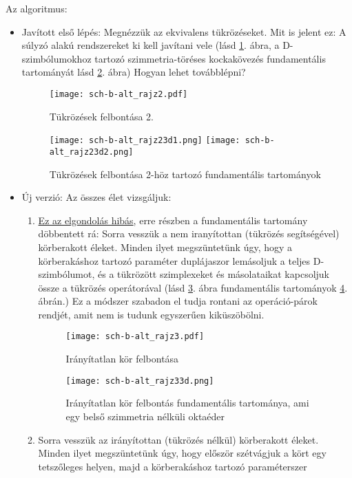 \documentclass[12pt,magyar,a4paper]{article}
\begin{document}
Az algoritmus:
\begin{itemize}
  \item Javított első lépés: Megnézzük az ekvivalens tükrözéseket. Mit is jelent
    ez: A súlyzó alakú rendszereket ki kell javítani vele (lásd \ref{schrajz2}.
    ábra, a D-szimbólumokhoz tartozó szimmetria-töréses kockakövezés
    fundamentális tartományát lásd \ref{schrajz23d}. ábra) Hogyan lehet továbblépni?
    \begin{figure}
      \caption{\label{schrajz2} Tükrözések felbontása 2.}
      \center
      \texttt{[image: sch-b-alt\_rajz2.pdf]}
    \end{figure}
    \begin{figure}
      \caption{\label{schrajz23d} Tükrözések felbontása 2-höz tartozó
      fundamentális tartományok}
      \center
      \texttt{[image: sch-b-alt\_rajz23d1.png]}
      \texttt{[image: sch-b-alt\_rajz23d2.png]}
    \end{figure}
  \item Új verzió: Az összes élet vizsgáljuk:
    \begin{enumerate}
      \item \underline{Ez az elgondolás hibás}, erre részben a fundamentális tartomány
	döbbentett rá: Sorra vesszük a nem iranyítottan (tükrözés segítségével) körberakott
	éleket. Minden ilyet megszüntetünk úgy, hogy a körberakáshoz tartozó
	paraméter duplájaszor lemásoljuk a teljes D-szimbólumot, és a
	tükrözött szimplexeket és másolataikat kapcsoljuk össze a tükrözés
	operátorával (lásd \ref{schrajz3}. ábra fundamentális tartományok
	\ref{schrajz33d}. ábrán.) Ez a módszer szabadon el tudja rontani az
	operáció-párok rendjét, amit nem is tudunk egyszerűen kiküszöbölni.
	\begin{figure}
	  \caption{\label{schrajz3} Irányítatlan kör felbontása}
	  \center
	  \texttt{[image: sch-b-alt\_rajz3.pdf]}
	\end{figure}
	\begin{figure}
	  \caption{\label{schrajz33d} Irányítatlan kör felbontás fundamentális
	  tartománya, ami egy belső szimmetria nélküli oktaéder}
	  \center
	  \texttt{[image: sch-b-alt\_rajz33d.png]}
	\end{figure}
      \item Sorra vesszük az irányítottan (tükrözés nélkül) körberakott éleket.
	Minden ilyet megszüntetünk úgy, hogy először szétvágjuk a kört egy
	tetszőleges helyen, majd a körberakáshoz tartozó paraméterszer

\end{enumerate}
\end{itemize}
\end{document}
